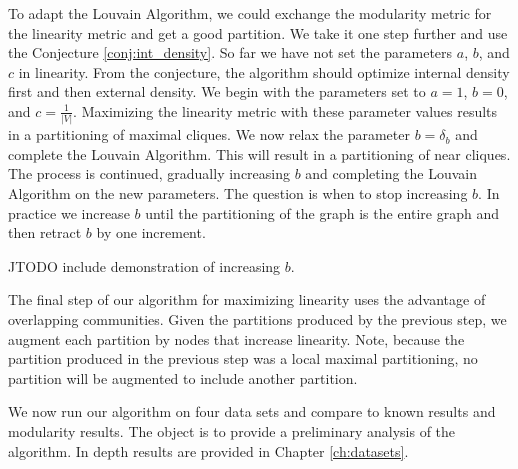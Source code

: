 \documentclass[phd,tocprelim]{cornell}
\begin{document}
To adapt the Louvain Algorithm, we could exchange the modularity metric for the linearity metric and get a good partition.  We take it one step further and use the Conjecture \ref{conj:int_density}.  So far we have not set the parameters $a$, $b$, and $c$ in linearity.  From the conjecture, the algorithm should optimize internal density first and then external density.  We begin with the parameters set to $a = 1$, $b = 0$, and $c = \frac{1}{ |V|}$.  Maximizing the linearity metric with these parameter values results in a partitioning of maximal cliques.  We now relax the parameter $b = \delta_b$ and complete the Louvain Algorithm.  This will result in a partitioning of near cliques.  The process is continued, gradually increasing $b$ and completing the Louvain Algorithm on the new parameters.  The question is when to stop increasing $b$.  In practice we increase $b$ until the partitioning of the graph is the entire graph and then retract $b$ by one increment.

JTODO include demonstration of increasing $b$.




The final step of our algorithm for maximizing linearity uses the advantage of overlapping communities.  Given the partitions produced by the previous step, we augment each partition by nodes that increase linearity.  Note, because the partition produced in the previous step was a local maximal partitioning, no partition will be augmented to include another partition.

We now run our algorithm on four data sets and compare to known results and modularity results.  The object is to provide a preliminary analysis of the algorithm.  In depth results are provided in Chapter \ref{ch:datasets}.
\end{document}
